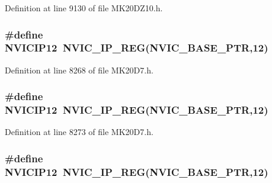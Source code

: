 Definition at line 9130 of file M\+K20\+D\+Z10.\+h.

\subsubsection[{\texorpdfstring{N\+V\+I\+C\+I\+P12}{NVICIP12}}]{\setlength{\rightskip}{0pt plus 5cm}\#define N\+V\+I\+C\+I\+P12~{\bf N\+V\+I\+C\+\_\+\+I\+P\+\_\+\+R\+EG}({\bf N\+V\+I\+C\+\_\+\+B\+A\+S\+E\+\_\+\+P\+TR},12)}\hypertarget{group___n_v_i_c___register___accessor___macros_ga7b91722822d39647199eaf6355421ff4}{}\label{group___n_v_i_c___register___accessor___macros_ga7b91722822d39647199eaf6355421ff4}


Definition at line 8268 of file M\+K20\+D7.\+h.

\subsubsection[{\texorpdfstring{N\+V\+I\+C\+I\+P12}{NVICIP12}}]{\setlength{\rightskip}{0pt plus 5cm}\#define N\+V\+I\+C\+I\+P12~{\bf N\+V\+I\+C\+\_\+\+I\+P\+\_\+\+R\+EG}({\bf N\+V\+I\+C\+\_\+\+B\+A\+S\+E\+\_\+\+P\+TR},12)}\hypertarget{group___n_v_i_c___register___accessor___macros_ga7b91722822d39647199eaf6355421ff4}{}\label{group___n_v_i_c___register___accessor___macros_ga7b91722822d39647199eaf6355421ff4}


Definition at line 8273 of file M\+K20\+D7.\+h.

\subsubsection[{\texorpdfstring{N\+V\+I\+C\+I\+P12}{NVICIP12}}]{\setlength{\rightskip}{0pt plus 5cm}\#define N\+V\+I\+C\+I\+P12~{\bf N\+V\+I\+C\+\_\+\+I\+P\+\_\+\+R\+EG}({\bf N\+V\+I\+C\+\_\+\+B\+A\+S\+E\+\_\+\+P\+TR},12)}\hypertarget{group___n_v_i_c___register___accessor___macros_ga7b91722822d39647199eaf6355421ff4}{}\label{group___n_v_i_c___register___accessor___macros_ga7b91722822d39647199eaf6355421ff4}


